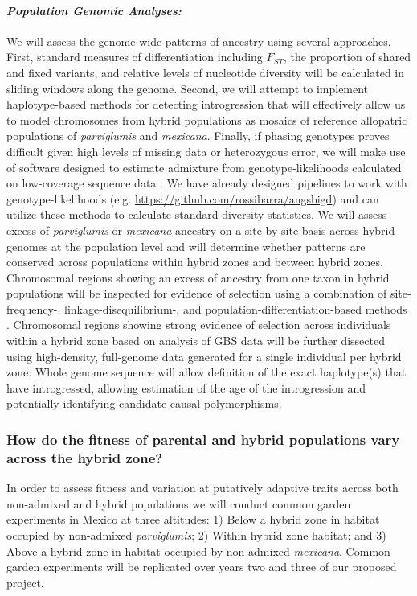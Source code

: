 \paragraph{\emph{Population Genomic Analyses:}} 
We will assess the genome-wide patterns of ancestry using several approaches.  
First, standard measures of differentiation including $F_{ST}$, the proportion of shared and fixed variants, and relative levels of nucleotide diversity \citep{Geneva2014} will be calculated in sliding windows along the genome. 
Second, we will attempt to implement haplotype-based methods for detecting introgression \citep[\emph{e.g.},][]{price2009, lawson2012} that will effectively allow us to model chromosomes from hybrid populations as mosaics of reference allopatric populations of \emph{parviglumis} and \emph{mexicana}.  
Finally, if phasing genotypes \citep{scheet2006fast} proves difficult given high levels of missing data or heterozygous error, we will make use of software designed to estimate admixture from genotype-likelihoods calculated on low-coverage sequence data \citep{skotte2013estimating}. 
We have already designed pipelines to work with genotype-likelihoods (e.g. \url{https://github.com/rossibarra/angsbigd}) and can utilize these methods to calculate standard diversity statistics.  
We will assess excess of \emph{parviglumis} or \emph{mexicana} ancestry on a site-by-site basis across hybrid genomes at the population level and will determine whether patterns are conserved across populations within hybrid zones and between hybrid zones.  Chromosomal regions showing an excess of ancestry from one taxon in hybrid populations will be inspected for evidence of selection using a combination of site-frequency-, linkage-disequilibrium-, and population-differentiation-based methods \citep[reviewed in][]{Vitti2013}. Chromosomal regions showing strong evidence of selection across individuals within a hybrid zone based on analysis of GBS data will be further dissected using high-density, full-genome data generated for a single individual per hybrid zone.  
Whole genome sequence will allow definition of the exact haplotype(s) that have introgressed, allowing estimation of the age of the introgression and potentially identifying candidate causal polymorphisms.  

\subsubsection{How do the fitness of parental and hybrid populations vary across the hybrid zone?} 
\label{sss:fitness}
In order to assess fitness and variation at putatively adaptive traits across both non-admixed and  hybrid populations we will conduct common garden experiments in Mexico at three altitudes: 1) Below a hybrid zone in habitat occupied by non-admixed \emph{parviglumis}; 2) Within hybrid zone habitat; and 3) Above a hybrid zone in habitat occupied by non-admixed \emph{mexicana}. 
Common garden experiments will be replicated over years two and three of our proposed project.  


